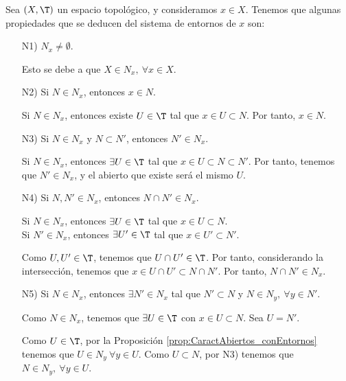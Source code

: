 Sea $(X,\T)$ un espacio topológico, y consideramos $x\in X$. Tenemos que algunas propiedades que se deducen del sistema de entornos de $x$ son:
\begin{enumerate}
    \item[N1)] $N_x\neq \emptyset$.
    
    Esto se debe a que $X\in N_x,~\forall x\in X$.
    \item[N2)] Si $N\in N_x$, entonces $x\in N$.

    Si $N\in N_x$, entonces existe $U\in \T$ tal que $x\in U\subset N$. Por tanto, $x\in N$.
    
    \item[N3)] Si $N\in N_x$ y $N\subset N'$, entonces $N'\in N_x$.

    Si $N\in N_x$, entonces $\exists U\in \T$ tal que $x\in U\subset N\subset N'$. Por tanto, tenemos que $N'\in N_x$, y el abierto que existe será el mismo $U$.
    
    \item[N4)] Si $N,N'\in N_x$, entonces $N\cap N'\in N_x$.

    Si $N\in N_x$, entonces $\exists U\in \T$ tal que $x\in U\subset N$.\\
    Si $N'\in N_x$, entonces $\exists U'\in \T$ tal que $x\in U'\subset N'$.

    Como $U,U'\in \T$, tenemos que $U\cap U'\in \T$. Por tanto, considerando la intersección, tenemos que $x\in U\cap U'\subset N\cap N'$. Por tanto, $N\cap N'\in N_x$.
    
    \item[N5)] Si $N\in N_x$, entonces $\exists N'\in N_x$ tal que $N'\subset N$ y $N\in N_y,~\forall y\in N'$.

    Como $N\in N_x$, tenemos que $\exists U\in \T$ con $x\in U\subset N$. Sea $U=N'$.

    Como $U\in \T$, por la Proposición \ref{prop:CaractAbiertos_conEntornos} tenemos que $U\in N_y~\forall y\in U$. Como $U\subset N$, por N3) tenemos que $N\in N_y,~\forall y\in U$.
\end{enumerate}



